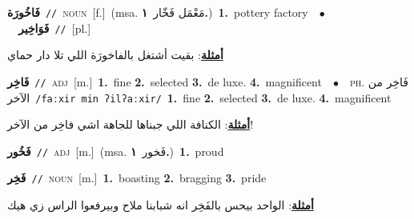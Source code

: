 \documentclass[10pt,a4paper,twoside]{article} %
\begin{document}
\begin{multicols}{2}
{\setlength\topsep{0pt}\textbf{\foreignlanguage{arabic}{فَاخُورَة}}\ {\color{gray}\texttt{//}\color{black}}\ \textsc{noun}\ [f.]\ \color{gray}(msa. \foreignlanguage{arabic}{مَعْمَل فَخّار}~\foreignlanguage{arabic}{\textbf{١.}})\color{black}\ \textbf{1.}~pottery factory\ \ $\bullet$\ \ \setlength\topsep{0pt}\textbf{\foreignlanguage{arabic}{فَوَاخِير}}\ {\color{gray}\texttt{//}\color{black}}\ [pl.]\  \begin{flushright}\color{gray}\foreignlanguage{arabic}{\textbf{\underline{\foreignlanguage{arabic}{أمثلة}}}: بقيت أشتغل بالفاخورَة اللي تلا دار حماي}\end{flushright}\color{black}} \vspace{2mm}

{\setlength\topsep{0pt}\textbf{\foreignlanguage{arabic}{فَاخِر}}\ {\color{gray}\texttt{//}\color{black}}\ \textsc{adj}\ [m.]\ \textbf{1.}~fine  \textbf{2.}~selected  \textbf{3.}~de luxe.  \textbf{4.}~magnificent\ \ $\bullet$\ \ \textsc{ph.} \color{gray} \foreignlanguage{arabic}{فَاخِر من الآخر}\color{black}\ {\color{gray}\texttt{/{\sffamily faːxir min ʔilʔaːxir}/}\color{black}}\ \textbf{1.}~fine  \textbf{2.}~selected  \textbf{3.}~de luxe.  \textbf{4.}~magnificent\  \begin{flushright}\color{gray}\foreignlanguage{arabic}{\textbf{\underline{\foreignlanguage{arabic}{أمثلة}}}: الكنافة اللي جبناها للجاهة اشي فاخِر من الآخر!}\end{flushright}\color{black}} \vspace{2mm}

{\setlength\topsep{0pt}\textbf{\foreignlanguage{arabic}{فَخُور}}\ {\color{gray}\texttt{//}\color{black}}\ \textsc{adj}\ [m.]\ \color{gray}(msa. \foreignlanguage{arabic}{فَخور}~\foreignlanguage{arabic}{\textbf{١.}})\color{black}\ \textbf{1.}~proud\ } \vspace{2mm}

{\setlength\topsep{0pt}\textbf{\foreignlanguage{arabic}{فَخِر}}\ {\color{gray}\texttt{//}\color{black}}\ \textsc{noun}\ [m.]\ \textbf{1.}~boasting  \textbf{2.}~bragging  \textbf{3.}~pride\  \begin{flushright}\color{gray}\foreignlanguage{arabic}{\textbf{\underline{\foreignlanguage{arabic}{أمثلة}}}: الواحد بيحس بالفَخِر انه شبابنا ملاح وبيرفعوا الراس زي هيك}\end{flushright}\color{black}} \vspace{2mm}


\end{multicols}
\end{document}
